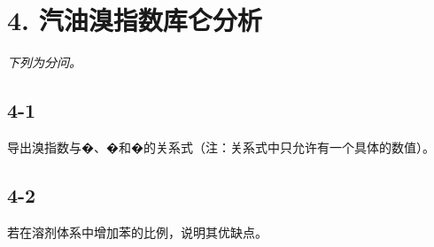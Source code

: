 \section*{4. 汽油溴指数库仑分析}
\textit{下列为分问。}

\subsection*{4-1}
导出溴指数与�、�和�的关系式（注：关系式中只允许有⼀个具体的数值）。

\subsection*{4-2}
若在溶剂体系中增加苯的⽐例，说明其优缺点。
